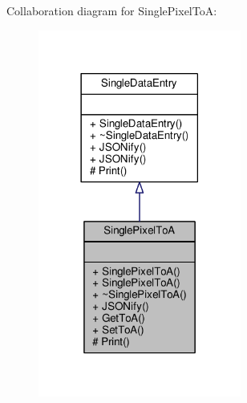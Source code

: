 Collaboration diagram for Single\+Pixel\+To\+A\+:
\nopagebreak
\begin{figure}[H]
\begin{center}
\leavevmode
\includegraphics[width=189pt]{classSinglePixelToA__coll__graph}
\end{center}
\end{figure}
